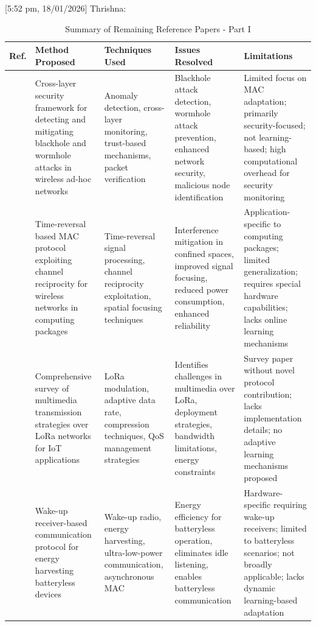 \documentclass[a4paper,fleqn]{cas-dc}
\numberwithin{equation}{section}
\begin{document}
[5:52 pm, 18/01/2026] Thrishna: \begin{table}[htbp]
\centering
\caption{Summary of Remaining Reference Papers - Part I}
\label{tab:remaining_papers_1}
\small
\begin{tabular}{|L{0.8cm}|L{3.2cm}|L{2.8cm}|L{3cm}|L{3.5cm}|}
\hline
\textbf{Ref.} & \textbf{Method Proposed} & \textbf{Techniques Used} & \textbf{Issues Resolved} & \textbf{Limitations} \\
\hline

{\cite{Srinivasan2025}} & Cross-layer security framework for detecting and mitigating blackhole and wormhole attacks in wireless ad-hoc networks & Anomaly detection, cross-layer monitoring, trust-based mechanisms, packet verification & Blackhole attack detection, wormhole attack prevention, enhanced network security, malicious node identification & Limited focus on MAC adaptation; primarily security-focused; not learning-based; high computational overhead for security monitoring \\
\hline

{\cite{Bandara2025}} & Time-reversal based MAC protocol exploiting channel reciprocity for wireless networks in computing packages & Time-reversal signal processing, channel reciprocity exploitation, spatial focusing techniques & Interference mitigation in confined spaces, improved signal focusing, reduced power consumption, enhanced reliability & Application-specific to computing packages; limited generalization; requires special hardware capabilities; lacks online learning mechanisms \\
\hline

{\cite{De2025}} & Comprehensive survey of multimedia transmission strategies over LoRa networks for IoT applications & LoRa modulation, adaptive data rate, compression techniques, QoS management strategies & Identifies challenges in multimedia over LoRa, deployment strategies, bandwidth limitations, energy constraints & Survey paper without novel protocol contribution; lacks implementation details; no adaptive learning mechanisms proposed \\
\hline

{\cite{Mosavat2025}} & Wake-up receiver-based communication protocol for energy harvesting batteryless devices & Wake-up radio, energy harvesting, ultra-low-power communication, asynchronous MAC & Energy efficiency for batteryless operation, eliminates idle listening, enables batteryless communication & Hardware-specific requiring wake-up receivers; limited to batteryless scenarios; not broadly applicable; lacks dynamic learning-based adaptation \\
\hline


\end{tabular}
\end{table}
\end{document}
